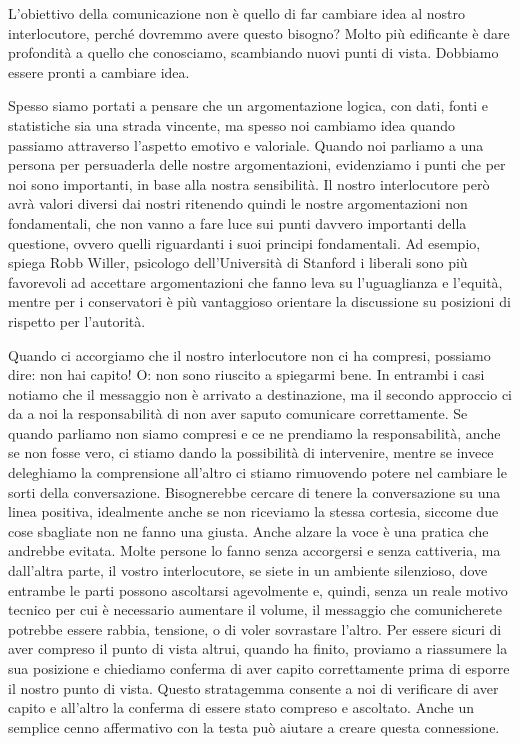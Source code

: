\documentclass[12pt]{book} %
\begin{document}
L'obiettivo della comunicazione non è quello di far cambiare idea al nostro interlocutore, perché dovremmo avere questo bisogno?
Molto più edificante è dare profondità a quello che conosciamo, scambiando nuovi punti di vista. Dobbiamo essere pronti a cambiare idea.

Spesso siamo portati a pensare che un argomentazione logica, con dati, fonti e statistiche sia una strada vincente, ma
spesso noi cambiamo idea quando passiamo attraverso l'aspetto emotivo e valoriale. Quando
noi parliamo a una persona per persuaderla delle nostre argomentazioni, evidenziamo i punti che per noi sono
importanti, in base alla nostra sensibilità. Il nostro interlocutore però avrà valori diversi dai nostri ritenendo
quindi le nostre argomentazioni non fondamentali, che non vanno a fare luce sui punti davvero importanti della
questione, ovvero quelli riguardanti i suoi principi fondamentali.
Ad esempio, spiega Robb Willer, psicologo dell'Università di Stanford i liberali sono più favorevoli ad accettare argomentazioni
che fanno leva su l'uguaglianza e l'equità, mentre per i conservatori è più vantaggioso orientare la discussione su
posizioni di rispetto per l'autorità.

Quando ci accorgiamo che il nostro interlocutore non ci ha
compresi, possiamo dire: non hai capito! O: non sono riuscito a spiegarmi bene. In entrambi i casi notiamo che il
messaggio non è arrivato a destinazione, ma il secondo approccio ci da a noi la responsabilità di non aver saputo
comunicare correttamente. Se quando parliamo non siamo compresi e ce ne prendiamo la responsabilità, anche se non fosse
vero, ci stiamo dando la possibilità di intervenire, mentre se invece deleghiamo la comprensione
all'altro ci stiamo rimuovendo potere nel cambiare le sorti della conversazione. Bisognerebbe
cercare di tenere la conversazione su una linea positiva, idealmente anche se non riceviamo la stessa cortesia, siccome due cose
sbagliate non ne fanno una giusta. Anche alzare la voce è una pratica che andrebbe evitata. Molte persone lo fanno
senza accorgersi e senza cattiveria, ma dall'altra parte, il vostro interlocutore, se siete in un
ambiente silenzioso, dove entrambe le parti possono ascoltarsi agevolmente e, quindi, senza un reale motivo tecnico per
cui è necessario aumentare il volume, il messaggio che comunicherete potrebbe essere rabbia, tensione, o di voler sovrastare
l'altro. Per essere sicuri di aver compreso il punto di vista altrui, quando ha finito, proviamo a
riassumere la sua posizione e chiediamo conferma di aver capito correttamente prima di esporre il nostro punto di
vista. Questo stratagemma consente a noi di verificare di aver capito e all'altro la conferma di
essere stato compreso e ascoltato. Anche un semplice cenno affermativo con la testa può aiutare a creare questa connessione. 
\end{document}
